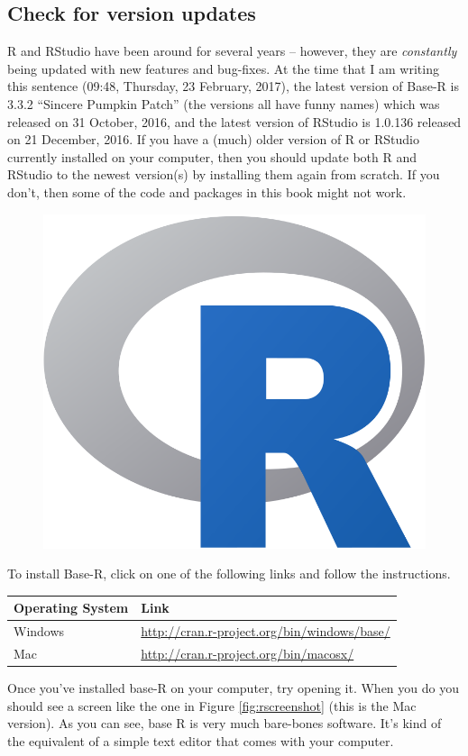 \documentclass[]{book}
\theoremstyle{definition}
\theoremstyle{definition}
\theoremstyle{remark}
\begin{document}
\subsection{Check for version updates}\label{check-for-version-updates}

R and RStudio have been around for several years -- however, they are
\emph{constantly} being updated with new features and bug-fixes. At the
time that I am writing this sentence (09:48, Thursday, 23 February,
2017), the latest version of Base-R is 3.3.2 ``Sincere Pumpkin Patch''
(the versions all have funny names) which was released on 31 October,
2016, and the latest version of RStudio is 1.0.136 released on 21
December, 2016. If you have a (much) older version of R or RStudio
currently installed on your computer, then you should update both R and
RStudio to the newest version(s) by installing them again from scratch.
If you don't, then some of the code and packages in this book might not
work.

\begin{figure}

{\centering \includegraphics[width=0.4\linewidth]{images/rlogo} 

}

\end{figure}

To install Base-R, click on one of the following links and follow the
instructions.

\begin{longtable}[]{@{}ll@{}}
\toprule
Operating System & Link\tabularnewline
\midrule
\endhead
Windows &
\url{http://cran.r-project.org/bin/windows/base/}\tabularnewline
Mac & \url{http://cran.r-project.org/bin/macosx/}\tabularnewline
\bottomrule
\end{longtable}

Once you've installed base-R on your computer, try opening it. When you
do you should see a screen like the one in Figure \ref{fig:rscreenshot}
(this is the Mac version). As you can see, base R is very much
bare-bones software. It's kind of the equivalent of a simple text editor
that comes with your computer.
\end{document}
